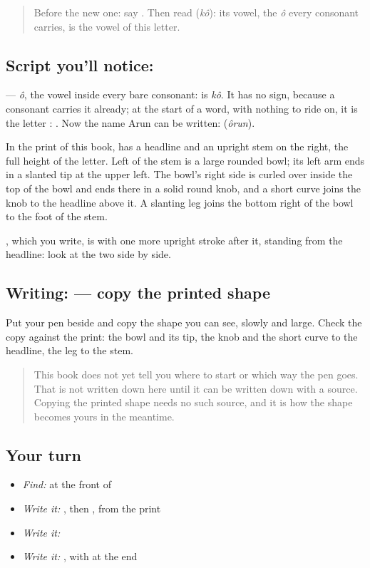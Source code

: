 \label{lesson:BN-W272-letter-o-indep}



\begin{quote}
Before the new one: say \textbf{}. Then read \textbf{} (\emph{kô}): its vowel, the \emph{ô} every consonant carries, is the vowel of this letter.
\end{quote}

\subsection*{Script you'll notice: }
\textbf{} — \emph{ô}, the vowel inside every bare consonant: \textbf{} is \emph{kô}. It has no sign, because a consonant carries it already; at the start of a word, with nothing to ride on, it is the letter \textbf{}: \textbf{}. Now the name Arun can be written: \textbf{} (\emph{ôrun}).

In the print of this book, \textbf{} has a headline and an upright stem on the right, the full height of the letter. Left of the stem is a large rounded bowl; its left arm ends in a slanted tip at the upper left. The bowl's right side is curled over inside the top of the bowl and ends there in a solid round knob, and a short curve joins the knob to the headline above it. A slanting leg joins the bottom right of the bowl to the foot of the stem.

\textbf{}, which you write, is \textbf{} with one more upright stroke after it, standing from the headline: look at the two side by side.

\subsection*{Writing:  — copy the printed shape}
Put your pen beside \textbf{} and copy the shape you can see, slowly and large. Check the copy against the print: the bowl and its tip, the knob and the short curve to the headline, the leg to the stem.

\begin{quote}
This book does not yet tell you where to start  or which way the pen goes. That is not written down here until it can be written down with a source. Copying the printed shape needs no such source, and it is how the shape becomes yours in the meantime.
\end{quote}

\subsection*{Your turn}
\begin{itemize}
\raggedright
  \item \emph{Find:}  at the front of \textbf{}
  \item \emph{Write it:} , then , from the print
  \item \emph{Write it:} \textbf{}
  \item \emph{Write it:} \textbf{}, with  at the end
\end{itemize}

